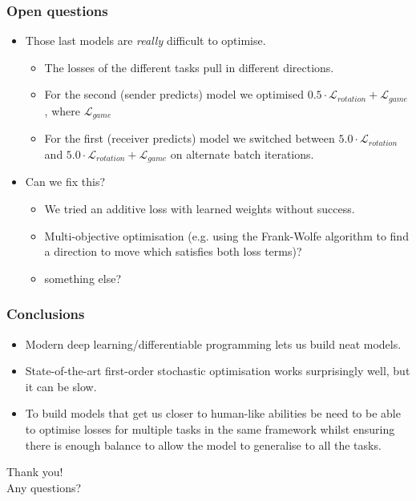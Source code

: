 \documentclass[\beamerclass,aspectratio=1610]{beamer}
\begin{document}
\begin{frame}
\frametitle{Open questions}

\begin{itemize}
	\item Those last models are \emph{really} difficult to optimise. 
	\begin{itemize}
		\item The losses of the different tasks pull in different directions. 
		\item For the second (sender predicts) model we optimised $0.5\cdot\mathcal{L}_{rotation} + \mathcal{L}_{game}$, where $\mathcal{L}_{game}$
		\item For the first (receiver predicts) model we switched between $5.0\cdot\mathcal{L}_{rotation}$ and $5.0\cdot\mathcal{L}_{rotation} + \mathcal{L}_{game}$ on alternate batch iterations.
	\end{itemize}
	\item Can we fix this?
	\begin{itemize}
		\item We tried an additive loss with learned weights without success. 
		\item Multi-objective optimisation (e.g. using the Frank-Wolfe algorithm to find a direction to move which satisfies both loss terms)? 
		\item something else?
	\end{itemize}
\end{itemize}

\end{frame}

\begin{frame}
\frametitle{Conclusions}

\begin{itemize}
	\item Modern deep learning/differentiable programming lets us build neat models.
	\item State-of-the-art first-order stochastic optimisation works surprisingly well, but it can be slow.
	\item To build models that get us closer to human-like abilities be need to be able to optimise losses for multiple tasks in the same framework whilst ensuring there is enough balance to allow the model to generalise to all the tasks.
\end{itemize}
\end{frame}

\begin{frame}
\centering
Thank you!
\\[1em]
Any questions?
\end{frame}
\end{document}
